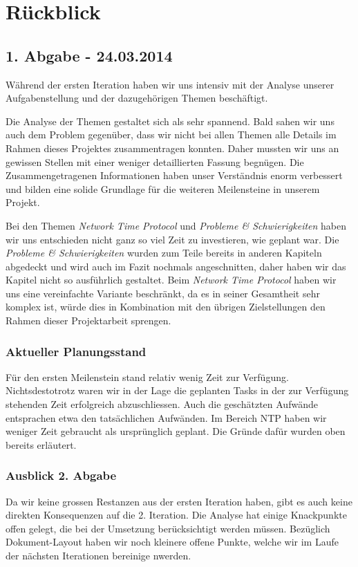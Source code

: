 \section{Rückblick}
\subsection{1. Abgabe - 24.03.2014}
Während der ersten Iteration haben wir uns intensiv mit der Analyse unserer Aufgabenstellung und der dazugehörigen Themen beschäftigt.

Die Analyse der Themen gestaltet sich als sehr spannend. Bald sahen wir uns auch dem Problem gegenüber, dass wir nicht bei allen Themen alle Details im Rahmen dieses Projektes zusammentragen konnten. Daher mussten wir uns an gewissen Stellen mit einer weniger detaillierten Fassung begnügen. Die Zusammengetragenen Informationen haben unser Verständnis enorm verbessert und bilden eine solide Grundlage für die weiteren Meilensteine in unserem Projekt.

Bei den Themen \textit{Network Time Protocol} und \textit{Probleme \& Schwierigkeiten} haben wir uns entschieden nicht ganz so viel Zeit zu investieren, wie geplant war. Die \textit{Probleme \& Schwierigkeiten} wurden zum Teile bereits in anderen Kapiteln abgedeckt und wird auch im Fazit nochmals angeschnitten, daher haben wir das Kapitel nicht so ausführlich gestaltet. Beim \textit{Network Time Protocol} haben wir uns eine vereinfachte Variante beschränkt, da es in seiner Gesamtheit sehr komplex ist, würde dies in Kombination mit den übrigen Zielstellungen den Rahmen dieser Projektarbeit sprengen.

\subsubsection{Aktueller Planungsstand}
Für den ersten Meilenstein stand relativ wenig Zeit zur Verfügung. Nichtsdestotrotz waren wir in der Lage die geplanten Tasks in der zur Verfügung stehenden Zeit erfolgreich abzuschliessen. Auch die geschätzten Aufwände entsprachen etwa den tatsächlichen Aufwänden. Im Bereich NTP haben wir weniger Zeit gebraucht als ursprünglich geplant. Die Gründe dafür wurden oben bereits erläutert.

\subsubsection{Ausblick 2. Abgabe}
Da wir keine grossen Restanzen aus der ersten Iteration haben, gibt es auch keine direkten Konsequenzen auf die 2. Iteration. Die Analyse hat einige Knackpunkte offen gelegt, die bei der Umsetzung berücksichtigt werden müssen. Bezüglich Dokument-Layout haben wir noch kleinere offene Punkte, welche wir im Laufe der nächsten Iterationen bereinige nwerden.

